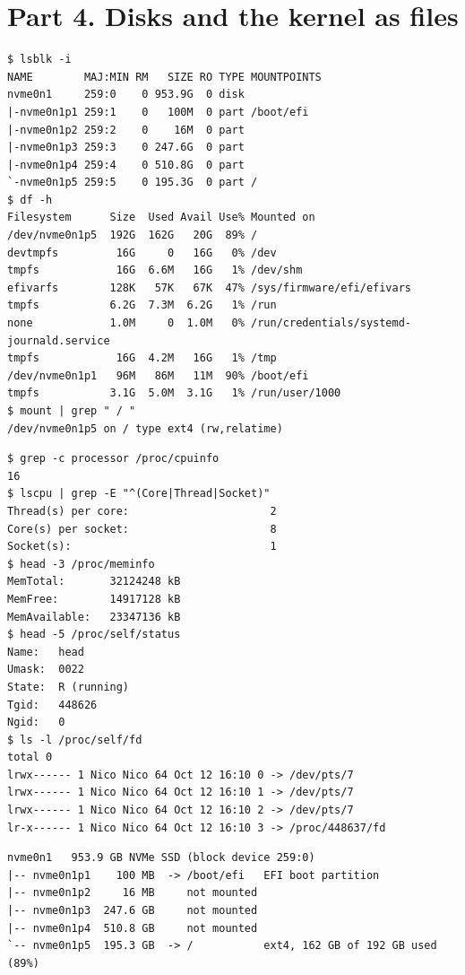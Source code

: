\documentclass[11pt,a4paper]{article}
\begin{document}
\section{Part 4. Disks and the kernel as files}

\begin{lstlisting}[caption={Disks, partitions and the root file system}]
$ lsblk -i
NAME        MAJ:MIN RM   SIZE RO TYPE MOUNTPOINTS
nvme0n1     259:0    0 953.9G  0 disk
|-nvme0n1p1 259:1    0   100M  0 part /boot/efi
|-nvme0n1p2 259:2    0    16M  0 part
|-nvme0n1p3 259:3    0 247.6G  0 part
|-nvme0n1p4 259:4    0 510.8G  0 part
`-nvme0n1p5 259:5    0 195.3G  0 part /
$ df -h
Filesystem      Size  Used Avail Use% Mounted on
/dev/nvme0n1p5  192G  162G   20G  89% /
devtmpfs         16G     0   16G   0% /dev
tmpfs            16G  6.6M   16G   1% /dev/shm
efivarfs        128K   57K   67K  47% /sys/firmware/efi/efivars
tmpfs           6.2G  7.3M  6.2G   1% /run
none            1.0M     0  1.0M   0% /run/credentials/systemd-journald.service
tmpfs            16G  4.2M   16G   1% /tmp
/dev/nvme0n1p1   96M   86M   11M  90% /boot/efi
tmpfs           3.1G  5.0M  3.1G   1% /run/user/1000
$ mount | grep " / "
/dev/nvme0n1p5 on / type ext4 (rw,relatime)
\end{lstlisting}

\begin{lstlisting}[caption={The kernel shown as files in /proc}]
$ grep -c processor /proc/cpuinfo
16
$ lscpu | grep -E "^(Core|Thread|Socket)"
Thread(s) per core:                      2
Core(s) per socket:                      8
Socket(s):                               1
$ head -3 /proc/meminfo
MemTotal:       32124248 kB
MemFree:        14917128 kB
MemAvailable:   23347136 kB
$ head -5 /proc/self/status
Name:	head
Umask:	0022
State:	R (running)
Tgid:	448626
Ngid:	0
$ ls -l /proc/self/fd
total 0
lrwx------ 1 Nico Nico 64 Oct 12 16:10 0 -> /dev/pts/7
lrwx------ 1 Nico Nico 64 Oct 12 16:10 1 -> /dev/pts/7
lrwx------ 1 Nico Nico 64 Oct 12 16:10 2 -> /dev/pts/7
lr-x------ 1 Nico Nico 64 Oct 12 16:10 3 -> /proc/448637/fd
\end{lstlisting}

\begin{lstlisting}[caption={Drawing of my disk}]
nvme0n1   953.9 GB NVMe SSD (block device 259:0)
|-- nvme0n1p1    100 MB  -> /boot/efi   EFI boot partition
|-- nvme0n1p2     16 MB     not mounted
|-- nvme0n1p3  247.6 GB     not mounted
|-- nvme0n1p4  510.8 GB     not mounted
`-- nvme0n1p5  195.3 GB  -> /           ext4, 162 GB of 192 GB used (89%)
\end{lstlisting}
\end{document}
